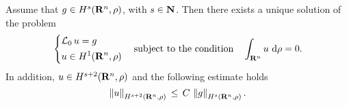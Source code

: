 \begin{lemma}
    Assume that $g \in H^{s}(\mathbf R^n, \rho)$,
    with $s\in \mathbf N$. Then there exists a unique solution of the problem
    $$
    \left\{ 
        \begin{aligned}
            &\mathcal L_0 \, u = g   \\
            &u \in H^{1}(\mathbf R^n, \rho)  
        \end{aligned} 
    \right .
    \quad \text{subject to the condition} \quad \int_{\mathbf R^n} u \, \,\mathrm d \rho = 0.
    $$
    In addition, $u \in H^{s+2}(\mathbf R^n, \rho)$ and the following estimate holds
    $$
        \left\| u \right\|_{H^{s+2}(\mathbf R^n, \rho)} \,\leq\, C \, \left\| g \right\|_{H^{s}(\mathbf R^n, \rho)}.
    $$
    \label{lemma: regularity of the solution of the cell problem}
\end{lemma}
